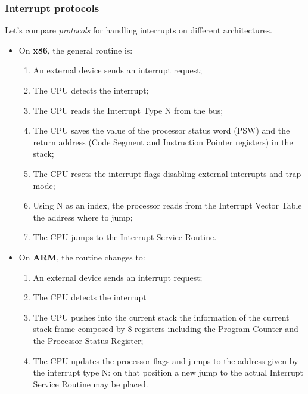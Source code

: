 \documentclass[a4paper,11pt]{article}
\begin{document}
\subsubsection{Interrupt protocols}

Let's compare \textit{protocols} for handling interrupts on different architectures.

\begin{itemize}
	\item On \textbf{x86}, the general routine is:
	      \begin{enumerate}
		      \item An external device sends an interrupt request;
		      \item The CPU detects the interrupt;
		      \item The CPU reads the Interrupt Type N from the bus;
		      \item The CPU saves the value of the processor status word (PSW) and the return address (Code Segment and Instruction Pointer registers) in the stack;
		      \item The CPU resets the interrupt flags disabling external interrupts and trap mode;
		      \item Using N as an index, the processor reads from the Interrupt Vector Table the address where to jump;
		      \item The CPU jumps to the Interrupt Service Routine.
	      \end{enumerate}
	\item On \textbf{ARM}, the routine changes to:
	      \begin{enumerate}
		      \item An external device sends an interrupt request;
		      \item The CPU detects the interrupt
		      \item The CPU pushes into the current stack the information of the current stack frame composed by 8 registers including the Program Counter and the Processor Status Register;
		      \item The CPU updates the processor flags and jumps to the address given by the interrupt type N: on that position a new jump to the actual Interrupt Service Routine may be placed.
	      \end{enumerate}
\end{itemize}
\end{document}

